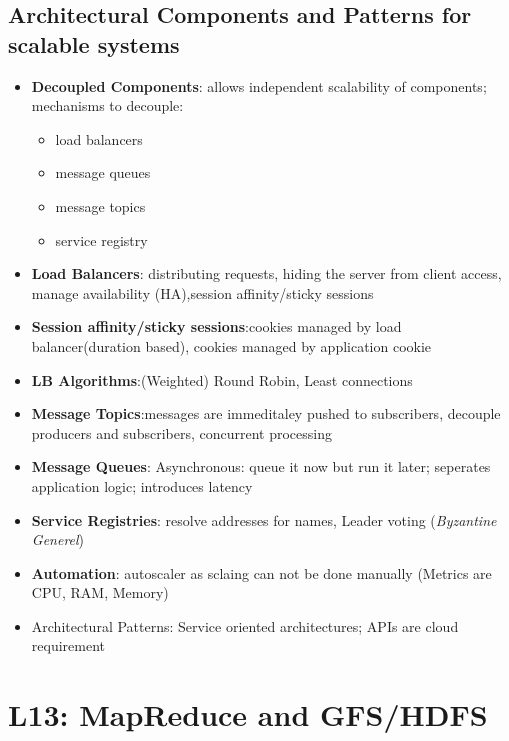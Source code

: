 \documentclass[a4paper]{article}
\begin{document}
\begin{multicols}{3}
\subsection{Architectural Components and Patterns for scalable systems}
\begin{itemize}
    \item \textbf{Decoupled Components}: allows independent scalability of components; mechanisms to decouple:
    \begin{itemize}
        \item load balancers
        \item message queues
        \item message topics
        \item service registry
    \end{itemize}
    \item \textbf{Load Balancers}: distributing requests, hiding the server from client access, manage availability (HA),session affinity/sticky sessions
    \item \textbf{Session affinity/sticky sessions}:cookies managed by load balancer(duration based), cookies managed by application cookie
    \item \textbf{LB Algorithms}:(Weighted) Round Robin, Least connections
    \item \textbf{Message Topics}:messages are immeditaley pushed to subscribers, decouple producers and subscribers, concurrent processing
    \item \textbf{Message Queues}: Asynchronous: queue it now but run it later; seperates application logic; introduces latency
    \item \textbf{Service Registries}: resolve addresses for names, Leader voting (\textit{Byzantine Generel})
    \item \textbf{Automation}: autoscaler as sclaing can not be done manually (Metrics are CPU, RAM, Memory)
    \item Architectural Patterns: Service oriented architectures;  APIs are cloud requirement
\end{itemize}

\section{L13: MapReduce and GFS/HDFS}


\end{multicols}
\end{document}
